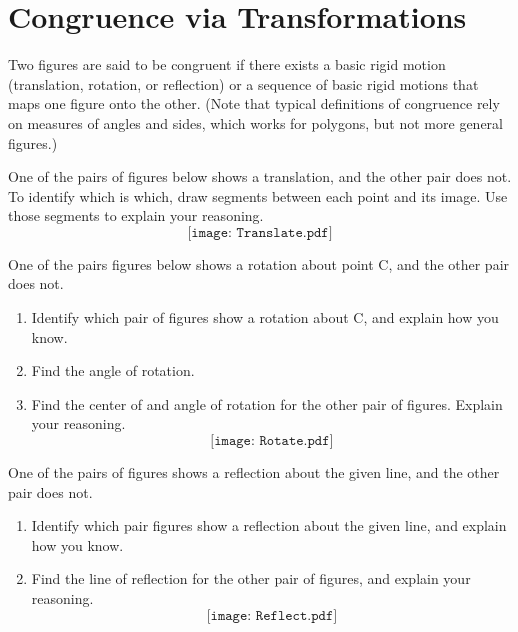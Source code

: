 \newpage

\section{Congruence via Transformations}
Two figures are said to be congruent if there exists a basic rigid motion (translation, 
rotation, or reflection) or a sequence of basic rigid motions that maps one figure onto 
the other.  (Note that typical definitions of congruence rely on measures of 
angles and sides, which works for polygons, but not more general figures.)  

\begin{prob}
One of the pairs of figures below shows a translation, and the other pair does not.  To identify which is which, draw segments between each point and its image.  Use those segments to explain your reasoning.
$$\texttt{[image: Translate.pdf]}$$
\end{prob}

\newpage

\begin{prob}
One of the pairs figures below shows a rotation about point C, and the other pair does not. 
\begin{enumerate}
\item Identify which pair of figures show a rotation about C, and explain how you know.  
\item Find the angle of rotation.  
\item Find the center of and angle of rotation for the other pair of figures.  Explain your reasoning.  
$$\texttt{[image: Rotate.pdf]}$$
\end{enumerate}
\end{prob}

\newpage
\begin{prob}
One of the pairs of figures shows a reflection about the given line, and the other pair does not.  
\begin{enumerate}
\item Identify which pair figures show a reflection about the given line, and explain how you know. 
\item Find the line of reflection for the other pair of figures, and explain your reasoning.  
$$\texttt{[image: Reflect.pdf]}$$
\end{enumerate}
\end{prob}

